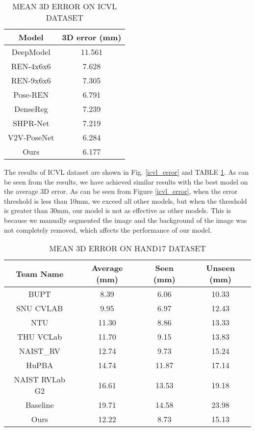 \documentclass[journal]{IEEEtran}
\begin{document}
\begin{table}[!t]
\renewcommand{\arraystretch}{1.3}
  \caption{MEAN 3D ERROR ON ICVL DATASET}
  \label{icvl_table}
  \centering
    \begin{tabular}{c c}
    \toprule
    Model & 3D error (mm)\\
    \hline
    DeepModel\cite{zhou2016model} & 11.561\\
    REN-4x6x6\cite{guo2017region} & 7.628\\
    REN-9x6x6\cite{wang2018region} & 7.305\\
    Pose-REN\cite{chen2017pose} & 6.791\\
    DenseReg\cite{wan2018dense} & 7.239\\
    SHPR-Net\cite{chen2018shpr} & 7.219\\
    V2V-PoseNet\cite{chang2018v2v} & 6.284\\
    \hline
    Ours & 6.177\\
    \bottomrule
    \end{tabular}
\end{table}

The results of ICVL dataset are shown in Fig\@. \ref{icvl_error} and TABLE \ref{icvl_table}.  
As can be seen from the results, we have achieved similar results with the best model\cite{chang2018v2v} on the average 3D error. 
As can be seen from Figure \ref{icvl_error}, when the error threshold is less than 10mm, we exceed all other models, 
but when the threshold is greater than 30mm, our model is not as effective as other models. 
This is because we manually segmented the image and the background of the image was not completely removed, 
which affects the performance of our model.

\begin{table}[!t]
\renewcommand{\arraystretch}{1.3}
  \caption{MEAN 3D ERROR ON HAND17 DATASET}
  \label{Hand17_table}
  \centering
    \begin{tabular}{c c c c}
    \toprule
    Team Name & Average (mm) & Seen (mm) & Unseen (mm)\\
    \hline
    BUPT & 8.39	& 6.06 & 10.33\\
    SNU CVLAB & 9.95 & 6.97 & 12.43\\
    NTU & 11.30 & 8.86 & 13.33\\
    THU VCLab & 11.70 & 9.15 & 13.83\\
    NAIST\_RV & 12.74 & 9.73 & 15.24\\
    HuPBA & 14.74 & 11.87 & 17.14\\
    NAIST RVLab G2 & 16.61 & 13.53 & 19.18\\
    Baseline & 19.71 & 14.58 & 23.98\\
    \hline
    Ours & 12.22 & 8.73 & 15.13\\
    \bottomrule
    \end{tabular}
\end{table}
\end{document}

